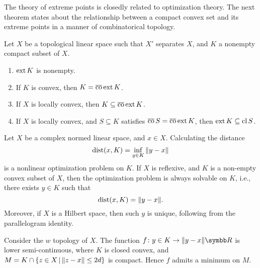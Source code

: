 The theory of extreme points is closedly related to optimization theory. The next theorem states about the relationship between a compact convex set and its extreme points in a manner of combinatorical topology.

\begin{theorem}
  Let $X$ be a topological linear space such that $X'$ separates $X$, and $K$ a nonempty compact subset of $X$.
  \begin{enumerate}
    \item $\operatorname{ext} K$ is nonempty.
    \item If $K$ is convex, then $K=\operatorname{\overline{co}}\operatorname{ext} K$.
    \item If $X$ is locally convex, then $K\subseteq \operatorname{\overline{co}}\operatorname{ext} K$.
    \item If $X$ is locally convex, and $S\subseteq K$ satisfies $\operatorname{\overline{co}} S=\operatorname{\overline{co}} \operatorname{ext} K$, then $\operatorname{ext} K\subseteq\operatorname{cl} S$.
  \end{enumerate}
\end{theorem}

\begin{example}
  Let $X$ be a complex normed linear space, and $x\in X$. Calculating the distance
  \begin{equation*}
    \operatorname{dist} (x, K)=\inf_{y\in K}\Vert y-x\Vert
  \end{equation*}
  is a nonlinear optimization problem on $K$. If $X$ is reflexive, and $K$ is a non-empty convex subset of $X$, then the optimization problem is always solvable on $K$, i.e., there exists $y\in K$ such that
  \begin{equation*}
    \operatorname{dist}(x, K)=\Vert y-x\Vert.
  \end{equation*}
  Moreover, if $X$ is a Hilbert space, then such $y$ is unique, following from the parallelogram identity.

  Consider the $w$ topology of $X$. The function $f\colon y\in K\to\NORM{y-x}\RR$ is lower semi-continuous, where $K$ is closed convex, and $M=K\cap\{z\in X\,\vert\, \Vert z-x\Vert\leq 2d\}$ is compact. Hence $f$ admits a minimum on $M$.
\end{example}





